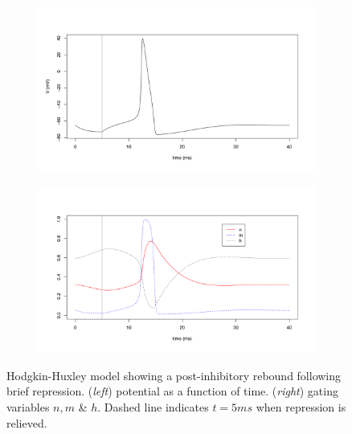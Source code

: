 \documentclass{article}
\begin{document}
\begin{figure}[h]
	\centering
	\begin{subfigure}[t]{0.45\linewidth}
		\centering
		\includegraphics[width = 1.0\linewidth, trim={20 60 40 70}, clip=true]{hh_jump_V.png}
		\label{fig:hhV}	
	\end{subfigure}%
	\hspace{0.05\linewidth}
	\begin{subfigure}[t]{0.45\linewidth}
		\centering
		\includegraphics[width = 1.0\linewidth, trim={20 60 40 70}, clip=true]{hh_jump_gating.png}
		\label{fig:hhV}	
	\end{subfigure}%

\caption{Hodgkin-Huxley model showing a post-inhibitory rebound following brief repression. (\textit{left}) potential as a function of time. (\textit{right}) gating variables $n, m$ \& $h$. Dashed line indicates $t=5ms$ when repression is relieved.}
\label{fig:hh_jump}
\end{figure}
\end{document}
